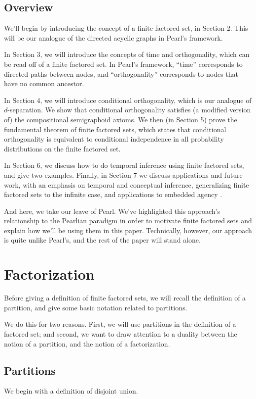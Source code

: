 \documentclass[authordate,onecolumn]{miri-tech-article}
\begin{document}
\subsection{Overview}

We'll begin by introducing the concept of a finite factored set, in Section 2. This will be our analogue of the directed acyclic graphs in Pearl's framework.

In Section 3, we will introduce the concepts of time and orthogonality, which can be read off of a finite factored set. In Pearl's framework, ``time'' corresponds to directed paths between nodes, and ``orthogonality'' corresponds to nodes that have no common ancestor.

In Section 4, we will introduce conditional orthogonality, which is our analogue of $d$-separation. We show that conditional orthogonality satisfies (a modified version of) the compositional semigraphoid axioms. We then (in Section 5) prove the fundamental theorem of finite factored sets, which states that conditional orthogonality is equivalent to conditional independence in all probability distributions on the finite factored set.

In Section 6, we discuss how to do temporal inference using finite factored sets, and give two examples. Finally, in Section 7 we discuss applications and future work, with an emphasis on temporal and conceptual inference, generalizing finite factored sets to the infinite case, and applications to embedded agency \citep{Demski:2019:embedded}.

And here, we take our leave of Pearl. We've highlighted this approach's relationship to the Pearlian paradigm in order to motivate finite factored sets and explain how we'll be using them in this paper. Technically, however, our approach is quite unlike Pearl's, and the rest of the paper will stand alone.

\section{Factorization}
Before giving a definition of finite factored sets, we will recall the definition of a partition, and give some basic notation related to partitions.

We do this for two reasons. First, we will use partitions in the definition of a factored set; and second, we want to draw attention to a duality between the notion of a partition, and the notion of a factorization.
\subsection{Partitions}
We begin with a definition of disjoint union.
\end{document}
